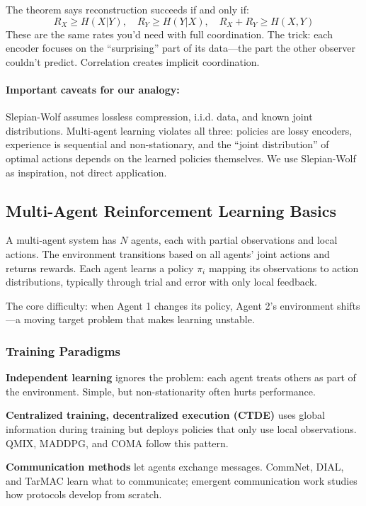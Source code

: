 \documentclass[10pt, letterpaper]{article}
\begin{document}
The theorem says reconstruction succeeds if and only if:
\[R_X \geq H(X|Y), \quad R_Y \geq H(Y|X), \quad R_X + R_Y \geq H(X,Y)\]
These are the same rates you'd need with full coordination. The trick: each encoder focuses on the ``surprising'' part of its data---the part the other observer couldn't predict. Correlation creates implicit coordination.

\paragraph{Important caveats for our analogy:} Slepian-Wolf assumes lossless compression, i.i.d. data, and known joint distributions. Multi-agent learning violates all three: policies are lossy encoders, experience is sequential and non-stationary, and the ``joint distribution'' of optimal actions depends on the learned policies themselves. We use Slepian-Wolf as inspiration, not direct application.

\subsection{Multi-Agent Reinforcement Learning Basics}

A multi-agent system has $N$ agents, each with partial observations and local actions. The environment transitions based on all agents' joint actions and returns rewards. Each agent learns a policy $\pi_i$ mapping its observations to action distributions, typically through trial and error with only local feedback.

The core difficulty: when Agent 1 changes its policy, Agent 2's environment shifts---a moving target problem that makes learning unstable.

\subsubsection*{Training Paradigms}

\textbf{Independent learning} ignores the problem: each agent treats others as part of the environment. Simple, but non-stationarity often hurts performance.

\textbf{Centralized training, decentralized execution (CTDE)} uses global information during training but deploys policies that only use local observations. QMIX, MADDPG, and COMA follow this pattern.

\textbf{Communication methods} let agents exchange messages. CommNet, DIAL, and TarMAC learn what to communicate; emergent communication work studies how protocols develop from scratch.
\end{document}
